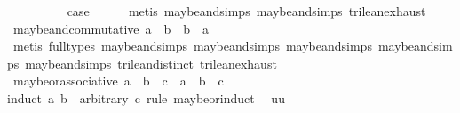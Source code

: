 \begin{isabellebody}
\isamarkupfalse%
\isanewline
\ \ \isamarkupfalse%
\ {}\isanewline
\ \ \isamarkupfalse%
\ \isamarkupfalse%
\ {\isacharquery}case\isanewline
\ \ \ \ \isamarkupfalse%
\ {\isacharparenleft}metis\ maybe{\isacharunderscore}and{\isachardot}simps{\isacharparenleft}{}{\isacharparenright}\ maybe{\isacharunderscore}and{\isachardot}simps{\isacharparenleft}{}{\isacharparenright}\ trilean{\isachardot}exhaust{\isacharparenright}\isanewline
{}\isamarkupfalse%
%
\endisatagproof
{\isafoldproof}%
%
\isadelimproof
\isanewline
%
\endisadelimproof
\isanewline
{}\isamarkupfalse%
\ maybe{\isacharunderscore}and{\isacharunderscore}commutative{\isacharcolon}\ {\isachardoublequoteopen}a\ {\isasymand}\isactrlsub {\isacharquery}\ b\ {\isacharequal}\ b\ {\isasymand}\isactrlsub {\isacharquery}\ a{\isachardoublequoteclose}\isanewline
%
\isadelimproof
\ \ %
\endisadelimproof
%
\isatagproof
{}\isamarkupfalse%
\ {\isacharparenleft}metis\ {\isacharparenleft}full{\isacharunderscore}types{\isacharparenright}\ maybe{\isacharunderscore}and{\isachardot}simps{\isacharparenleft}{}{\isacharparenright}\ maybe{\isacharunderscore}and{\isachardot}simps{\isacharparenleft}{}{\isacharparenright}\ maybe{\isacharunderscore}and{\isachardot}simps{\isacharparenleft}{}{\isacharparenright}\ maybe{\isacharunderscore}and{\isachardot}simps{\isacharparenleft}{}{\isacharparenright}\ maybe{\isacharunderscore}and{\isachardot}simps{\isacharparenleft}{}{\isacharparenright}\ trilean{\isachardot}distinct{\isacharparenleft}{}{\isacharparenright}\ trilean{\isachardot}exhaust{\isacharparenright}%
\endisatagproof
{\isafoldproof}%
%
\isadelimproof
\isanewline
%
\endisadelimproof
\isanewline
{}\isamarkupfalse%
\ maybe{\isacharunderscore}or{\isacharunderscore}associative{\isacharcolon}\ {\isachardoublequoteopen}a\ {\isasymor}\isactrlsub {\isacharquery}\ b\ {\isasymor}\isactrlsub {\isacharquery}\ c\ {\isacharequal}\ a\ {\isasymor}\isactrlsub {\isacharquery}\ {\isacharparenleft}b\ {\isasymor}\isactrlsub {\isacharquery}\ c{\isacharparenright}{\isachardoublequoteclose}\isanewline
%
\isadelimproof
%
\endisadelimproof
%
\isatagproof
{}\isamarkupfalse%
{\isacharparenleft}induct\ a\ b\ \ arbitrary{\isacharcolon}\ c\ rule{\isacharcolon}\ maybe{\isacharunderscore}or{\isachardot}induct{\isacharparenright}\isanewline
{}\isamarkupfalse%
\ {\isacharparenleft}{}\ uu{\isacharparenright}\isanewline

\end{isabellebody}
